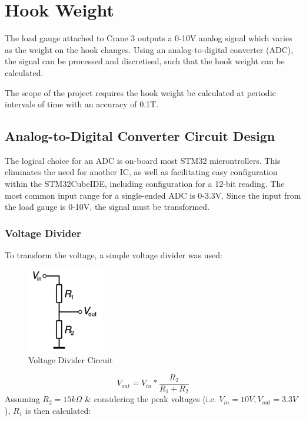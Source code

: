 \documentclass[12pt, a4paper]{article}
\begin{document}
\newpage

\section{Hook Weight}
The load gauge attached to Crane 3 outputs a 0-10V analog signal which varies as the weight on the hook changes.
Using an analog-to-digital converter (ADC), the signal can be processed and discretised, such that the hook weight can be calculated.

The scope of the project requires the hook weight be calculated at periodic intervals of time with an accuracy of 0.1T. 
\subsection{Analog-to-Digital Converter Circuit Design}
The logical choice for an ADC is on-board most STM32 microntrollers. This eliminates the need for another IC, as well as facilitating
easy configuration within the STM32CubeIDE, including configuration for a 12-bit reading. The most common input range for a single-ended ADC 
is 0-3.3V. Since the input from the load gauge is 0-10V, the signal must be transformed. 
\subsubsection{Voltage Divider}
To transform the voltage, a simple voltage divider was used:
\begin{figure}[h]
    \centering
    \includegraphics[width=0.3\textwidth]{voltage divider.png}
    \caption{Voltage Divider Circuit}
    \label{fig:v_divider}
\end{figure}

\[V_{out}= V_{in}*\frac{R_2}{R_1+R_2}\]
Assuming $R_2=15k\Omega$ \& considering the peak voltages (i.e. $V_{in}=10V,  V_{out}=3.3V$), $R_1$ is then calculated:
\end{document}
